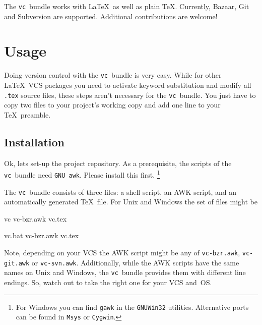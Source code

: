 \documentclass[11pt]{article}
\newlength{\sbslistingwd}
\newcommand*{\pkg}{\texttt{vc}}
\begin{document}
The \pkg\ bundle works with \LaTeX\ as well as plain \TeX.  Currently,
Bazaar, Git and Subversion are supported.  Additional contributions are
welcome!



\section{Usage}
\label{sec:usage}
Doing version control with the \pkg\ bundle is very easy.  While for
other \LaTeX\ VCS packages you need to activate keyword substitution and
modify all \texttt{.tex} source files, these steps aren't necessary for
the \pkg\ bundle.  You just have to copy two files to your project's
working copy and add one line to your \TeX\ preamble.


\subsection{Installation}
\label{sec:installation}
Ok, lets set-up the project repository.  As a prerequisite, the scripts
of the \pkg\ bundle need \texttt{GNU awk}.  Please install this first.%
\footnote{For Windows you can find \texttt{gawk} in the
  \texttt{GNUWin32} utilities.  Alternative ports can be found in
  \texttt{Msys} or \texttt{Cygwin}.} %

The \pkg\ bundle consists of three files: a shell script, an AWK script,
and an automatically generated \TeX\ file.  For Unix and Windows the set
of files might be\newline
\begin{minipage}{\textwidth}
  \begin{minipage}[t]{\sbslistingwd}
    \begin{listing}[style=text, title=Unix\strut]
vc
vc-bzr.awk
vc.tex
    \end{listing}
  \end{minipage}\hfill
  \begin{minipage}[t]{\sbslistingwd}
    \begin{listing}[style=text, title=Windows\strut]
vc.bat
vc-bzr.awk
vc.tex
    \end{listing}
  \end{minipage}
\end{minipage}
Note, depending on your VCS the AWK script might be any of
\texttt{vc-bzr.awk}, \texttt{vc-git.awk} or \texttt{vc-svn.awk}.
Additionally, while the AWK scripts have the same names on Unix and
Windows, the \pkg\ bundle provides them with different line endings.
So, watch out to take the right one for your VCS and~OS.
\end{document}
